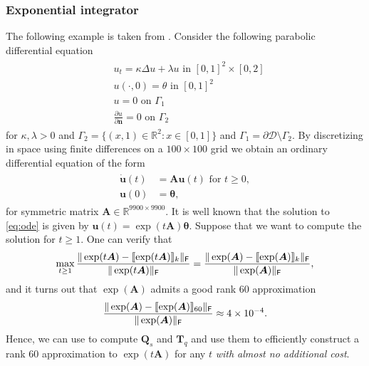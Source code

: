 \subsubsection{Exponential integrator}\label{section:exponential_integrator}
The following example is taken from \cite{persson_kressner_23}. Consider the following parabolic differential equation
\begin{align*}
\begin{split}
    &u_t = \kappa \Delta u + \lambda u \text{ in } [0,1]^2 \times [0,2]\\
    &u(\cdot,0) = \theta \text{ in } [0,1]^2\\
    &u = 0 \text{ on } \Gamma_1\\
    & \frac{\partial u}{\partial \bm{n}} = 0 \text{ on } \Gamma_2
\end{split}
\end{align*}
for $\kappa, \lambda > 0$ and $\Gamma_2 = \{(x,1) \in \mathbb{R}^{2} : x \in [0,1] \}$ and $\Gamma_1 = \partial \mathcal{D} \setminus \Gamma_2$. By discretizing in space using finite differences on a $100 \times 100$ grid we obtain an ordinary differential equation of the form
\begin{align}
\begin{split}
    \dot{\bm{u}}(t) &= \bm{A} \bm{u}(t) \text{ for } t \geq 0,\\
    \bm{u}(0) &= \bm{\theta}, \label{eq:ode}
\end{split}
\end{align}
for symmetric matrix $\bm{A} \in \mathbb{R}^{9900 \times 9900}$. It is well known that the solution to \eqref{eq:ode} is given by $\bm{u}(t) = \exp(t\bm{A})\bm{\theta}$. Suppose that we want to compute the solution for $t \geq 1$. One can verify that 
\begin{equation*}
    \max\limits_{t \geq 1} \frac{\|\exp(t\bm{A}) - \llbracket\exp(t\bm{A})\rrbracket_{k}\|_{\textsf{\textup{F}}}}{\|\exp(t\bm{A})\|_{\textsf{\textup{F}}}} = \frac{\|\exp(\bm{A}) - \llbracket\exp(\bm{A})\rrbracket_{k}\|_{\textsf{\textup{F}}}}{\|\exp(\bm{A})\|_{\textsf{\textup{F}}}},
\end{equation*}
and it turns out that $\exp(\bm{A})$ admits a good rank $60$ approximation
\begin{equation*}
    \frac{\|\exp(\bm{A}) - \llbracket\exp(\bm{A})\rrbracket_{60}\|_{\textsf{\textup{F}}}}{\|\exp(\bm{A})\|_{\textsf{\textup{F}}}} \approx 4 \times 10^{-4}.
\end{equation*}
Hence, we can use  to compute $\bm{Q}_s$ and $\bm{T}_q$ and use them to efficiently construct a rank $60$ approximation to $\exp(t\bm{A})$ for any $t$ \emph{with almost no additional cost}. 

